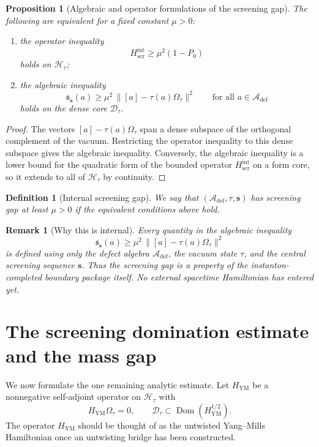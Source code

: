 \documentclass[11pt]{article}
\theoremstyle{plainstyle}
\newtheorem{proposition}[theorem]{Proposition}
\theoremstyle{defstyle}
\newtheorem{definition}[theorem]{Definition}
\newtheorem{remark}[theorem]{Remark}
\newcommand{\A}{\mathcal{A}}
\newcommand{\Htau}{\mathcal{H}_{\tau}}
\newcommand{\Dtau}{\mathcal{D}_{\tau}}
\newcommand{\Omegatau}{\Omega_{\tau}}
\begin{document}
\begin{proposition}[Algebraic and operator formulations of the screening gap]
The following are equivalent for a fixed constant $\mu>0$:
\begin{enumerate}[label=(\roman*)]
\item the operator inequality
\[
H_{\mathrm{scr}}^{\mathrm{int}}\ge \mu^2(1-P_0)
\]
holds on $\Htau$;
\item the algebraic inequality
\[
\mathfrak s_{\mathbf s}(a)\ge \mu^2\,\bigl\|[a]-\tau(a)\Omegatau\bigr\|^2
\qquad\text{for all }a\in \A_{\mathrm{def}}
\]
holds on the dense core $\Dtau$.
\end{enumerate}
\end{proposition}

\begin{proof}
The vectors $[a]-\tau(a)\Omegatau$ span a dense subspace of the orthogonal complement of the vacuum.
Restricting the operator inequality to this dense subspace gives the algebraic inequality.
Conversely, the algebraic inequality is a lower bound for the quadratic form of the bounded operator
$H_{\mathrm{scr}}^{\mathrm{int}}$ on a form core, so it extends to all of $\Htau$ by continuity.
\end{proof}

\begin{definition}[Internal screening gap]
We say that $(\A_{\mathrm{def}},\tau,\mathbf s)$ has \emph{screening gap} at least $\mu>0$
if the equivalent conditions above hold.
\end{definition}

\begin{remark}[Why this is internal]
Every quantity in the algebraic inequality
\[
\mathfrak s_{\mathbf s}(a)\ge \mu^2\,\bigl\|[a]-\tau(a)\Omegatau\bigr\|^2
\]
is defined using only the defect algebra $\A_{\mathrm{def}}$, the vacuum state $\tau$, and the central screening sequence $\mathbf s$.
Thus the screening gap is a property of the instanton-completed boundary package itself.
No external spacetime Hamiltonian has entered yet.
\end{remark}

\section{The screening domination estimate and the mass gap}

We now formulate the one remaining analytic estimate.
Let $H_{\mathrm{YM}}$ be a nonnegative self-adjoint operator on $\Htau$ with
\[
H_{\mathrm{YM}}\Omegatau=0,
\qquad
\Dtau\subset \operatorname{Dom}(H_{\mathrm{YM}}^{1/2}).
\]
The operator $H_{\mathrm{YM}}$ should be thought of as the untwisted Yang--Mills Hamiltonian once an untwisting bridge has been constructed.
\end{document}
